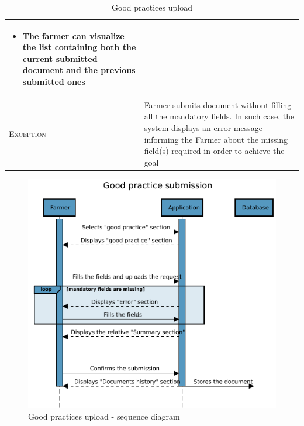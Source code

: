 \begin{table}[H]
\begin{tabular}{|l|p{}|}
\begin{itemize}
    	    \item The farmer can visualize the list containing both the current submitted document and the previous submitted ones
    	\end{itemize}\\
    	\hline %
    	\textsc{Exception}         &   Farmer submits document without filling all the mandatory fields. In such case, the system displays an error message informing the Farmer about the missing field(s) required in order to achieve the goal\\
    	\hline %
        
    \end{tabular}

\caption{\label{tab:good_practice_submission}Good practices upload}
\end{table}

\begin{figure}[H]
	\centering
    \includegraphics[page=1, width=\textwidth]{Images/SeqDiag/good_practice_seq_diag.pdf}
	\caption{\label{fig:good_practice_seq_diag}Good practices upload - sequence diagram}
\end{figure}


